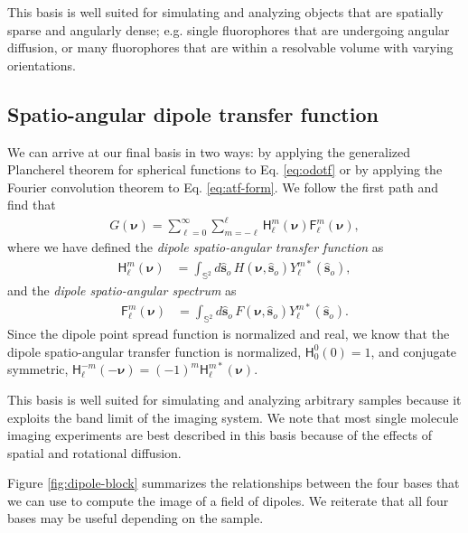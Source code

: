 \documentclass[]{osa-article}
\providecommand{\msf}[1]{\mathsf{#1}}
\providecommand{\so}{\mathbf{\hat{s}}_o}
\providecommand{\mbb}[1]{\mathbb{#1}}
\providecommand{\bs}[1]{\boldsymbol{#1}}
\providecommand{\bv}{\bs{\nu}}
\providecommand{\lmsum}{\sum_{\ell=0}^\infty\sum_{m=-\ell}^{\ell}}
\begin{document}
This basis is well suited for simulating and analyzing objects that are
spatially sparse and angularly dense; e.g. single fluorophores that are
undergoing angular diffusion, or many fluorophores that are within a resolvable
volume with varying orientations.

\subsection{Spatio-angular dipole transfer function}
We can arrive at our final basis in two ways: by applying the generalized
Plancherel theorem for spherical functions to Eq. \eqref{eq:odotf} or by applying
the Fourier convolution theorem to Eq. \eqref{eq:atf-form}. We follow the
first path and find that
\begin{align}
G(\bv) = \lmsum \msf{H}_\ell^m(\bv)\msf{F}_\ell^m(\bv) \label{eq:saft},
\end{align}
where we have defined the \textit{dipole spatio-angular transfer function} as
  \begin{align}
  \msf{H}_\ell^m(\bv) &= \int_{\mbb{S}^2}d\so\, H(\bv, \so)Y_\ell^{m*}(\so),
  \end{align}
  and the \textit{dipole spatio-angular spectrum} as
  \begin{align}
  \msf{F}_\ell^m(\bv) &= \int_{\mbb{S}^2}d\so\, F(\bv, \so)Y_\ell^{m*}(\so).
  \end{align}
  Since the dipole point spread function is normalized and real, we know
  that the dipole spatio-angular transfer function is normalized,
  $\msf{H}_0^0(0) = 1$, and conjugate symmetric,
  $\msf{H}_\ell^{-m}(-\bv) = (-1)^m\msf{H}_\ell^{m*}(\bv)$.
  
  This basis is well suited for simulating and analyzing arbitrary samples
  because it exploits the band limit of the imaging system. %
  We note that most single molecule imaging experiments
  are best described in this basis because of the effects of spatial and
  rotational diffusion.

  Figure \ref{fig:dipole-block} summarizes the relationships between the four
  bases that we can use to compute the image of a field of dipoles. We reiterate
  that all four bases may be useful depending on the sample.
    
\end{document}

